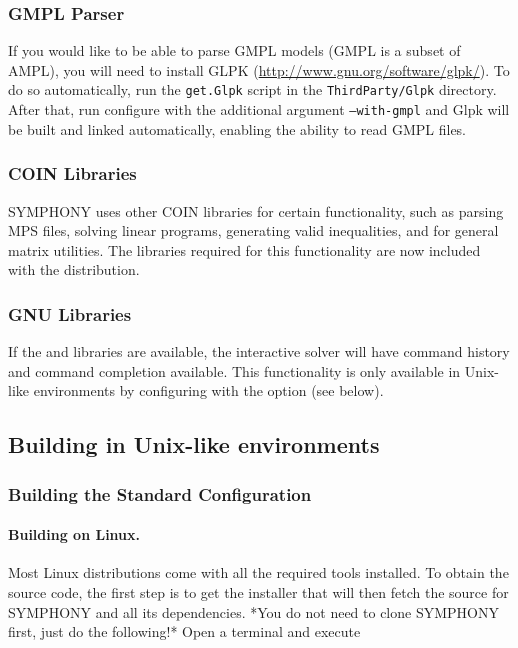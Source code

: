 \subsubsection{GMPL Parser} If you would like to be able to parse GMPL models
(GMPL is a subset of AMPL), you will need to install GLPK
(\url{http://www.gnu.org/software/glpk/}). To do so automatically, run the
\texttt{get.Glpk} script in the \texttt{ThirdParty/Glpk} directory. After
that, run configure with the additional argument \texttt{--with-gmpl} and Glpk 
will be built and linked automatically, enabling the ability to read GMPL 
files.

\subsubsection{COIN Libraries} SYMPHONY uses other COIN libraries for certain
functionality, such as parsing MPS files, solving linear programs, generating
valid inequalities, and for general matrix utilities. The libraries required
for this functionality are now included with the distribution.

\subsubsection{GNU Libraries} If the  and  libraries
are available, the interactive solver will have command history and command
completion available. This functionality is only available in Unix-like
environments by configuring with the  option (see
below).

\subsection{Building in Unix-like environments}
\label{getting_started_unix}

\subsubsection{Building the Standard Configuration}

\paragraph{Building on Linux.}

Most Linux distributions come with all the required tools installed. To obtain
the source code, the first step is to get the installer that will then
fetch the source for SYMPHONY and all its dependencies. *You do not need to
clone SYMPHONY first, just do the following!* Open a terminal and execute

